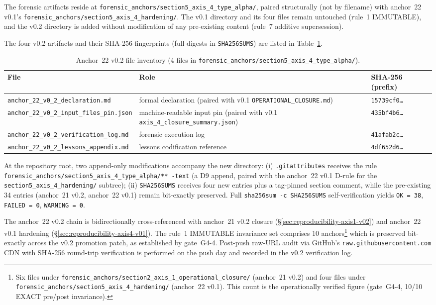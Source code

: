 \documentclass[11pt,a4paper]{ltjsarticle}
\begin{document}
The forensic artifacts reside at
\texttt{forensic\_anchors/section5\_axis\_4\_type\_alpha/}, paired
structurally (not by filename) with anchor~22 v0.1's
\texttt{forensic\_anchors/section5\_axis\_4\_hardening/}. The v0.1
directory and its four files remain untouched (rule~1 IMMUTABLE), and
the v0.2 directory is added without modification of any pre-existing
content (rule~7 additive supersession).

The four v0.2 artifacts and their SHA-256 fingerprints (full digests
in \texttt{SHA256SUMS}) are listed in
Table~\ref{tab:anchor-22-v02-files}.

\begin{table}[h]
\centering
\small
\caption{Anchor~22 v0.2 file inventory (4 files in
\texttt{forensic\_anchors/section5\_axis\_4\_type\_alpha/}).}
\label{tab:anchor-22-v02-files}
\begin{tabular}{lll}
\hline
File & Role & SHA-256 (prefix) \\
\hline
\texttt{anchor\_22\_v0\_2\_declaration.md}
  & formal declaration (paired with v0.1
    \texttt{OPERATIONAL\_CLOSURE.md})
  & \texttt{15739cf0\dots} \\
\texttt{anchor\_22\_v0\_2\_input\_files\_pin.json}
  & machine-readable input pin (paired with v0.1
    \texttt{axis\_4\_closure\_summary.json})
  & \texttt{435bf4b6\dots} \\
\texttt{anchor\_22\_v0\_2\_verification\_log.md}
  & forensic execution log
  & \texttt{41afab2c\dots} \\
\texttt{anchor\_22\_v0\_2\_lessons\_appendix.md}
  & lessons codification reference
  & \texttt{4df652d6\dots} \\
\hline
\end{tabular}
\end{table}

At the repository root, two append-only modifications accompany the
new directory: (i) \texttt{.gitattributes} receives the rule
\texttt{forensic\_anchors/section5\_axis\_4\_type\_alpha/** -text}
(a D9 append, paired with the anchor~22 v0.1 D-rule for the
\texttt{section5\_axis\_4\_hardening/} subtree); (ii)
\texttt{SHA256SUMS} receives four new entries plus a tag-pinned
section comment, while the pre-existing 34 entries (anchor~21 v0.2,
anchor~22 v0.1) remain bit-exactly preserved. Full
\texttt{sha256sum -c SHA256SUMS} self-verification yields
\texttt{OK = 38}, \texttt{FAILED = 0}, \texttt{WARNING = 0}.

The anchor~22 v0.2 chain is bidirectionally cross-referenced with
anchor~21 v0.2 closure (\S\ref{sec:reproducibility-axis1-v02}) and
anchor~22 v0.1 hardening (\S\ref{sec:reproducibility-axis4-v01}). The
rule~1 IMMUTABLE invariance set comprises 10 anchors\footnote{Six
files under
\texttt{forensic\_anchors/section2\_axis\_1\_operational\_closure/}
(anchor~21 v0.2) and four files under
\texttt{forensic\_anchors/section5\_axis\_4\_hardening/}
(anchor~22 v0.1). This count is the operationally verified figure
(gate~G4-4, 10/10 EXACT pre/post invariance).} which is preserved
bit-exactly across the v0.2 promotion patch, as established by
gate~G4-4. Post-push raw-URL audit via GitHub's
\texttt{raw.githubusercontent.com} CDN with SHA-256 round-trip
verification is performed on the push day and recorded in the v0.2
verification log.
\end{document}

